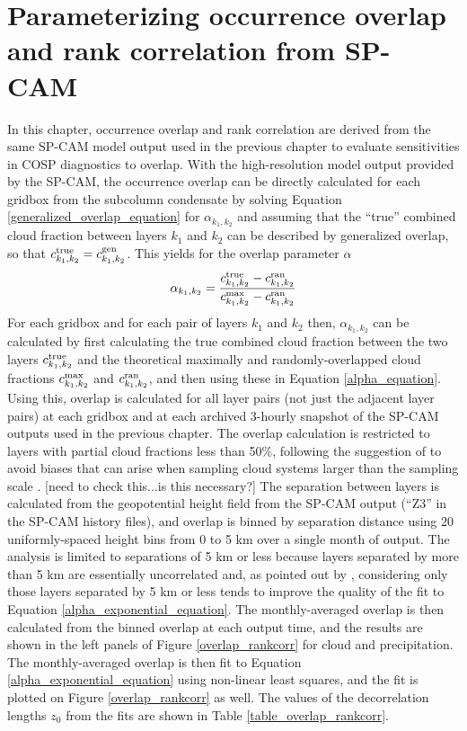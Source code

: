 \section{Parameterizing occurrence overlap and rank correlation from SP-CAM}
\label{subgrid2_overlap_section}
In this chapter, occurrence overlap and rank correlation are derived from the same SP-CAM model output used in the previous chapter to evaluate sensitivities in COSP diagnostics to overlap. With the high-resolution model output provided by the SP-CAM, the occurrence overlap can be directly calculated for each gridbox from the subcolumn condensate by solving Equation \ref{generalized_overlap_equation} for $\alpha_{k_1, k_2}$ and assuming that the ``true'' combined cloud fraction between layers $k_1$ and $k_2$ can be described by generalized overlap, so that $c^{\rm true}_{k_1, k_2} = c^{\rm gen}_{k_1, k_2}$. This yields for the overlap parameter $\alpha$
\begin{gather}
    \alpha_{k_1, k_2} = \frac{
        c^{\rm true}_{k_1, k_2} - c^{\rm ran}_{k_1, k_2}
    }{
        c^{\rm max}_{k_1, k_2} - c^{\rm ran}_{k_1, k_2}
    }
    \label{alpha_equation}
\end{gather}
For each gridbox and for each pair of layers $k_1$ and $k_2$ then, $\alpha_{k_1, k_2}$ can be calculated by first calculating the true combined cloud fraction between the two layers $c^{\rm true}_{k_1, k_2}$ and the theoretical maximally and randomly-overlapped cloud fractions $c^{\rm max}_{k_1, k_2}$ and $c^{\rm ran}_{k_1, k_2}$, and then using these in Equation \ref{alpha_equation}. Using this, overlap is calculated for all layer pairs (not just the adjacent layer pairs) at each gridbox and at each archived 3-hourly snapshot of the SP-CAM outputs used in the previous chapter. The overlap calculation is restricted to layers with partial cloud fractions less than 50\%, following the suggestion of \cite{tompkins_and_digiuseppe_2015} to avoid biases that can arise when sampling cloud systems larger than the sampling scale \citep[e.g.,][]{astin_and_digirolamo_2014, tompkins_and_digiuseppe_2015}. [need to check this...is this necessary?] The separation between layers is calculated from the geopotential height field from the SP-CAM output (``Z3'' in the SP-CAM history files), and overlap is binned by separation distance using 20 uniformly-spaced height bins from 0 to 5 km over a single month of output. The analysis is limited to separations of 5 km or less because layers separated by more than 5 km are essentially uncorrelated and, as pointed out by \cite{pincus_et_al_2005}, considering only those layers separated by 5 km or less tends to improve the quality of the fit to Equation \ref{alpha_exponential_equation}. The monthly-averaged overlap is then calculated from the binned overlap at each output time, and the results are shown in the left panels of Figure \ref{overlap_rankcorr} for cloud and precipitation. The monthly-averaged overlap is then fit to Equation \ref{alpha_exponential_equation} using non-linear least squares, and the fit is plotted on Figure \ref{overlap_rankcorr} as well. The values of the decorrelation lengths $z_0$ from the fits are shown in Table \ref{table_overlap_rankcorr}.

